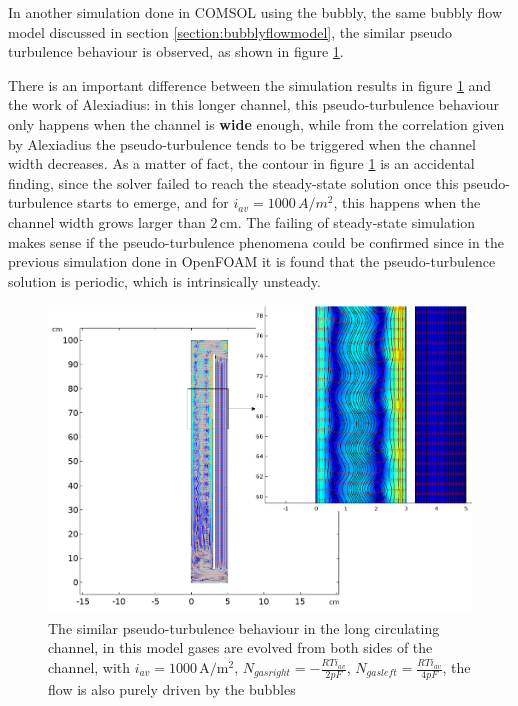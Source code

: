 In another simulation done in COMSOL using the bubbly, the same bubbly flow model discussed in section \ref{section:bubblyflowmodel}, the similar pseudo turbulence behaviour is observed, as shown in figure \ref{pseudocirculat}. 

There is an important difference between the simulation results in figure \ref{pseudocirculat} and the work of Alexiadius: in this longer channel, this pseudo-turbulence behaviour only happens when the channel is \textbf{wide} enough, while from the correlation given by Alexiadius the pseudo-turbulence tends to be triggered when the channel width decreases. As a matter of fact, the contour in figure \ref{pseudocirculat} is an accidental finding, since the solver failed to reach the steady-state solution once this pseudo-turbulence starts to emerge, and for $i_{av} = 1000 \, A/m^2$, this happens when the channel width grows larger than $2 \, \mathrm{cm}$. The failing of steady-state simulation makes sense if the pseudo-turbulence phenomena could be confirmed since in the previous simulation done in OpenFOAM it is found that the pseudo-turbulence solution is periodic, which is intrinsically unsteady.

\begin{figure}[H]
    \centering
    \includegraphics[width=\textwidth]{pseudocirculat.png}
    \caption{The similar pseudo-turbulence behaviour in the long circulating channel, in this model gases are evolved from both sides of the channel, with $i_{av} = 1000 \, \mathrm{A/m^2}$, $N_{gasright} = - \frac{RTi_{av}}{2pF}$, $N_{gasleft} = \frac{RTi_{av}}{4pF}$, the flow is also purely driven by the bubbles}
    \label{pseudocirculat}
\end{figure}

